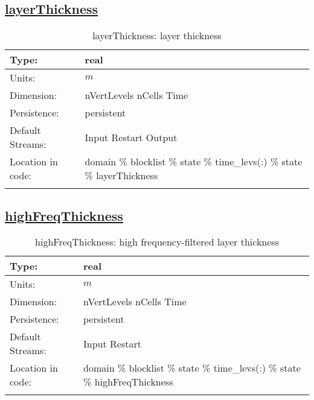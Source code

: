 \subsection[layerThickness]{\hyperref[sec:var_tab_state]{layerThickness}}
\label{subsec:var_sec_state_layerThickness}
\begin{center}
\begin{longtable}{| p{2.0in} | p{4.0in} |}
        \hline 
        Type: & real \\
        \hline 
        Units: & $m$ \\
        \hline 
        Dimension: & nVertLevels nCells Time \\
        \hline 
        Persistence: & persistent \\
        \hline 
		 Default Streams: & Input Restart Output  \\
        \hline 
		 Location in code: & domain \% blocklist \% state \% time\_levs(:) \% state \% layerThickness \\
		 \hline 
    \caption{layerThickness: layer thickness}
\end{longtable}
\end{center}
\subsection[highFreqThickness]{\hyperref[sec:var_tab_state]{highFreqThickness}}
\label{subsec:var_sec_state_highFreqThickness}
\begin{center}
\begin{longtable}{| p{2.0in} | p{4.0in} |}
        \hline 
        Type: & real \\
        \hline 
        Units: & $m$ \\
        \hline 
        Dimension: & nVertLevels nCells Time \\
        \hline 
        Persistence: & persistent \\
        \hline 
		 Default Streams: & Input Restart  \\
        \hline 
		 Location in code: & domain \% blocklist \% state \% time\_levs(:) \% state \% highFreqThickness \\
		 \hline 
    \caption{highFreqThickness: high frequency-filtered layer thickness}
\end{longtable}
\end{center}
